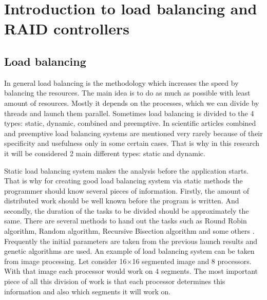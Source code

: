 \chapter{Introduction to load balancing and RAID controllers}
\label{chap2:title}


\section{Load balancing}

In general load balancing is the methodology which increases the speed by balancing the resources. The main idea is to do as much as possible with least amount of resources. Mostly it depends on the processes, which we can divide by threads and launch them parallel. Sometimes load balancing is divided to the 4 types: static, dynamic, combined and preemptive. In scientific articles combined and preemptive load balancing systems are mentioned very rarely because of their specificity and usefulness only in some certain cases. That is why in this research it will be considered 2 main different types: static and dynamic.


Static load balancing system makes the analysis before the application starts. That is why for creating good load balancing system via static methods the programmer should know several pieces of information. Firstly, the amount of distributed work should be well known before the program is written. And secondly, the duration of the tasks to be divided should be approximately the same. There are several methods to hand out the tasks such as Round Robin algorithm, Random algorithm, Recursive Bisection algorithm and some others \cite{oper_sys_conc}. Frequently the initial parameters are taken from the previous launch results and genetic algorithms are used. An example of load balancing system can be taken from image processing. Let consider 16$\times$16 segmented image and 8 processors. With that image each processor would work on 4 segments. The most important piece of all this division of work is that each processor determines this information and also which segments it will work on.


